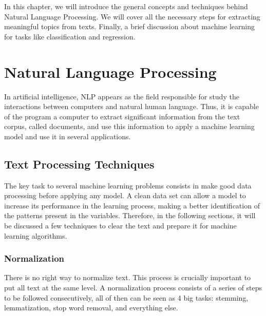 In this chapter, we will introduce the general concepts and techniques behind Natural Language Processing. We will cover all the necessary steps for extracting meaningful topics from texts. Finally, a brief discussion about machine learning for tasks like classification and regression.


\section{Natural Language Processing}

	In artificial intelligence, NLP appears as the field responsible for study the interactions between computers and natural human language. Thus, it is capable of the program a computer to extract significant information from the text corpus, called documents, and use this information to apply a machine learning model and use it in several applications. 

	\subsection{Text Processing Techniques}\label{sec:text-processing}
	
	The key task to several machine learning problems consists in make good data processing before applying any model. A clean data set can allow a model to increase its performance in the learning process, making a better identification of the patterns present in the variables. Therefore, in the following sections, it will be discussed a few techniques to clear the text and prepare it for machine learning algorithms.
	
	\subsubsection{Normalization}
	
	There is no right way to normalize text. This process is crucially important to put all text at the same level. A normalization process consists of a series of steps to be followed consecutively, all of then can be seen as 4 big tasks: stemming, lemmatization, stop word removal, and everything else.
	
